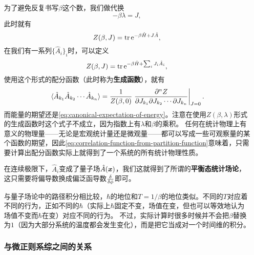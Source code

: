 \documentclass[hyperref, UTF8, a4paper]{ctexart}
\newcommand*{\ee}{\mathrm{e}}
\begin{document}
为了避免反复书写$\beta$这个数，我们做代换
\[
    - \beta \lambda = J,
\]
此时就有
\begin{equation}
    Z(\beta, J) = \trace \ee^{-\beta \hat{H} + J \hat{A}},
\end{equation}
在我们有一系列$\{\hat{A}_i\}_i$时，可以定义
\begin{equation}
    Z(\beta, J) = \trace \ee^{-\beta \hat{H} + \sum_i J_i \hat{A}_i },
\end{equation}
使用这个形式的配分函数（此时称为\textbf{生成函数}），就有
\begin{equation}
    \expval*{\hat{A}_{k_1} \hat{A}_{k_2} \cdots \hat{A}_{k_n}} = \frac{1}{Z(\beta,0)} \eval{\frac{\partial^n Z}{\partial J_{k_1} \partial J_{k_2} \cdots \partial J_{k_n}}}_{J=0}.
    \label{eq:correlation-function-from-partition-function}
\end{equation}
而能量的期望还是\eqref{eq:canonical-expectation-of-energy}。注意在使用$Z(\beta, \lambda)$形式的生成函数时这个式子不成立，因为指数上有$\lambda$和$\beta$的乘积。
任何在统计物理上有意义的物理量——无论是宏观统计量还是微观量——都可以写成一些可观察量的某个函数的期望，因此\eqref{eq:correlation-function-from-partition-function}意味着，只需要计算出配分函数实际上就得到了一个系统的所有统计物理性质。

在连续极限下，$\hat{A}_i$变成了量子场$\hat{A}(\vb*{x})$，我们这就得到了所谓的\textbf{平衡态统计场论}，这只需要将偏导数换成偏泛函导数$\fdv{\phi}$即可。

与量子场论中的路径积分相比较，$\hbar$的地位和$T=1/\beta$的地位类似。不同的$T$对应着不同的行为，正如不同的$\hbar$（实际上$\hbar$固定不变，场值在变，但也可以等效地认为场值不变而$\hbar$在变）对应不同的行为。
不过，实际计算时很多时候并不会把$\beta$替换为$1$（因为大部分系统的温度都会发生变化），而是把它当成对一个时间维的积分。

\subsubsection{与微正则系综之间的关系}
\end{document}
